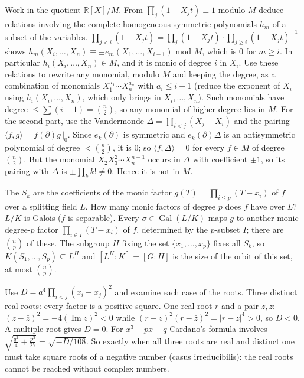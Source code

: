 \documentclass[11pt,a4paper]{article}
\begin{document}
 Work in the quotient $\mathbb{R}[X]/M$. From $\prod_{j}(1-X_jt)\equiv1$ modulo $M$ deduce relations involving the complete homogeneous symmetric polynomials $h_m$ of a subset of the variables.
 $\prod_{j<i}(1-X_jt)=\prod_{j}(1-X_jt)\cdot\prod_{j\ge i}(1-X_jt)^{-1}$ shows $h_m(X_i,\dots,X_n)\equiv\pm e_m(X_1,\dots,X_{i-1})$ mod $M$, which is $0$ for $m\ge i$. In particular $h_i(X_i,\dots,X_n)\in M$, and it is monic of degree $i$ in $X_i$.
 Use these relations to rewrite any monomial, modulo $M$ and keeping the degree, as a combination of monomials $X_1^{a_1}\cdots X_n^{a_n}$ with $a_i\le i-1$ (reduce the exponent of $X_i$ using $h_i(X_i,\dots,X_n)$, which only brings in $X_i,\dots,X_n$). Such monomials have degree $\le\sum(i-1)=\binom n2$, so any monomial of higher degree lies in $M$.
 For the second part, use the Vandermonde $\Delta=\prod_{i<j}(X_j-X_i)$ and the pairing $\langle f,g\rangle=f(\partial)g\,\big|_{0}$. Since $e_k(\partial)$ is symmetric and $e_k(\partial)\Delta$ is an antisymmetric polynomial of degree $<\binom n2$, it is $0$; so $\langle f,\Delta\rangle=0$ for every $f\in M$ of degree $\binom n2$.
 But the monomial $X_2X_3^2\cdots X_n^{n-1}$ occurs in $\Delta$ with coefficient $\pm1$, so its pairing with $\Delta$ is $\pm\prod_k k!\ne0$. Hence it is not in $M$.

 The $S_k$ are the coefficients of the monic factor $g(T)=\prod_{i\le p}(T-x_i)$ of $f$ over a splitting field $L$. How many monic factors of degree $p$ does $f$ have over $L$?
 $L/K$ is Galois ($f$ is separable). Every $\sigma\in\operatorname{Gal}(L/K)$ maps $g$ to another monic degree-$p$ factor $\prod_{i\in I}(T-x_i)$ of $f$, determined by the $p$-subset $I$; there are $\binom np$ of these.
 The subgroup $H$ fixing the set $\{x_1,\dots,x_p\}$ fixes all $S_k$, so $K(S_1,\dots,S_p)\subseteq L^H$ and $[L^H:K]=[G:H]$ is the size of the orbit of this set, at most $\binom np$.

 Use $D=a^4\prod_{i<j}(x_i-x_j)^2$ and examine each case of the roots.
 Three distinct real roots: every factor is a positive square. One real root $r$ and a pair $z,\bar z$: $(z-\bar z)^2=-4(\operatorname{Im}z)^2<0$ while $(r-z)^2(r-\bar z)^2=|r-z|^4>0$, so $D<0$. A multiple root gives $D=0$.
 For $x^3+px+q$ Cardano's formula involves $\sqrt{\frac{q^2}4+\frac{p^3}{27}}=\sqrt{-D/108}$. So exactly when all three roots are real and distinct one must take square roots of a negative number (casus irreducibilis): the real roots cannot be reached without complex numbers.
\end{document}
